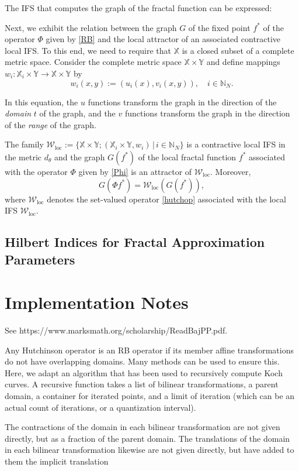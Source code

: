 \documentclass[english,11pt,letterpaper,onecolumn]{scrartcl}
\numberwithin{equation}{section}
\newcommand{\st}{\,|\,}
\newcommand{\N}{\mathbb{N}}
\newcommand{\X}{\mathbb{X}}
\newcommand{\Y}{\mathbb{Y}}
\newcommand{\cW}{\mathcal{W}}
\newcommand{\be}{\begin{equation}}
\newcommand{\ee}{\end{equation}}
\newcommand{\loc}{\mathrm{loc}}
\begin{document}
The IFS that computes the graph of the fractal function can be expressed:

Next, we exhibit the relation between the graph $G$ of the fixed point $f^*$ of the operator $\Phi$ given by \eqref{RB} and the local attractor of an associated contractive local IFS. To this end, we need to require that $\X$ is a closed subset of a complete metric space. Consider the complete metric space $\X\times\Y$ and define mappings $w_i:\X_i\times\Y\to\X\times\Y$ by
\[
w_i (x, y) := (u_i (x), v_i (x,y)), \quad i\in \N_N.
\]

In this equation, the $u$ functions transform the graph in the direction of the
\emph{domain} $t$ of the graph, and the $v$ functions transform the graph in the
direction of the \emph{range} of the graph.

The family $\cW_\loc := \{\X\times\Y; (\X_i\times\Y, w_i)\st i\in \N_N\}$ is a contractive local IFS in the metric $d_\theta$ and the graph $G(f^*)$ of the local fractal function $f^*$ associated with the operator $\Phi$ given by \eqref{Phi} is an attractor of $\cW_\loc$. Moreover,
\be\label{GW}
G(\Phi f^*) = \cW_\loc (G(f^*)),
\ee
where $\cW_\loc$ denotes the set-valued operator \eqref{hutchop} associated with the local IFS $\cW_\loc$.


\subsection{Hilbert Indices for Fractal Approximation Parameters}

\section{Implementation Notes}

See https://www.marksmath.org/scholarship/ReadBajPP.pdf.

Any Hutchinson operator is an RB operator if its member affine transformations do not have overlapping domains.
Many methods can be used to ensure this. Here, we adapt an algorithm that has been used to recursively compute
Koch curves. A recursive function takes a list of bilinear transformations, a parent domain, a container for
iterated points, and a limit of iteration (which can be an actual count of iterations, or a quantization interval).

The contractions of the domain in each bilinear transformation are not given directly, but as a fraction of the
parent domain. The translations of the domain in each bilinear transformation likewise are not given directly,
but have added to them the implicit translation
\end{document}
